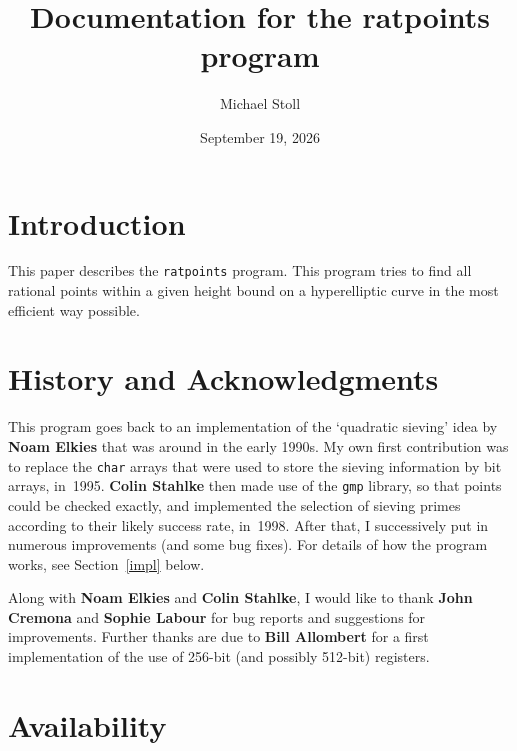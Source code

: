 \documentclass[12pt,a4paper,oneside]{amsart}
\begin{document}
\title{Documentation for the ratpoints program}

\author{Michael Stoll}
\address{Mathematisches Institut,
         Universit\"at Bayreuth,
         95440 Bayreuth, Germany.}
\date{September 19, 2026}

\maketitle


\section{Introduction}

This paper describes the \texttt{ratpoints} program. This program tries to
find all rational points within a given height bound on a hyperelliptic
curve in the most efficient way possible.


\section{History and Acknowledgments}

This program goes back to an implementation of the `quadratic sieving'
idea by \textbf{Noam Elkies} that was around in the early 1990s. My own
first contribution was to replace the \texttt{char} arrays that were used
to store the sieving information by bit arrays, in~1995. \textbf{Colin Stahlke}
then made use of the \texttt{gmp} library, so that points could be checked
exactly, and implemented the selection of sieving primes according to
their likely success rate, in~1998. After that, I successively put in
numerous improvements (and some bug fixes). For details of how the
program works, see Section~\ref{impl} below.

Along with \textbf{Noam Elkies} and \textbf{Colin Stahlke}, I would like to
thank \textbf{John Cremona} and \textbf{Sophie Labour} for bug reports and
suggestions for improvements. Further thanks are due to \textbf{Bill Allombert}
for a first implementation of the use of 256-bit (and possibly 512-bit) registers.


\section{Availability}
\end{document}
